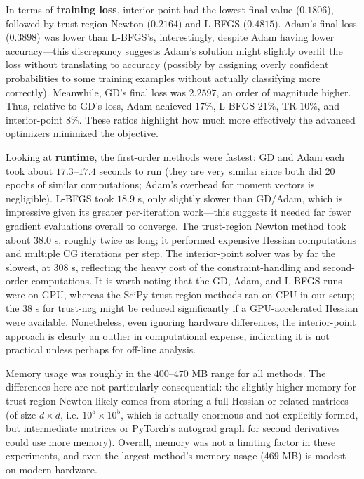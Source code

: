 \documentclass[12pt]{article}
\begin{document}
In terms of \textbf{training loss}, interior-point had the lowest final value ($0.1806$), followed by trust-region Newton ($0.2164$) and L-BFGS ($0.4815$). Adam’s final loss ($0.3898$) was lower than L-BFGS’s, interestingly, despite Adam having lower accuracy—this discrepancy suggests Adam’s solution might slightly overfit the loss without translating to accuracy (possibly by assigning overly confident probabilities to some training examples without actually classifying more correctly). Meanwhile, GD’s final loss was $2.2597$, an order of magnitude higher. Thus, relative to GD’s loss, Adam achieved $17\%$, L-BFGS $21\%$, TR $10\%$, and interior-point $8\%$. These ratios highlight how much more effectively the advanced optimizers minimized the objective.

Looking at \textbf{runtime}, the first-order methods were fastest: GD and Adam each took about $17.3$–$17.4$ seconds to run (they are very similar since both did 20 epochs of similar computations; Adam’s overhead for moment vectors is negligible). L-BFGS took $18.9$ s, only slightly slower than GD/Adam, which is impressive given its greater per-iteration work—this suggests it needed far fewer gradient evaluations overall to converge. The trust-region Newton method took about $38.0$ s, roughly twice as long; it performed expensive Hessian computations and multiple CG iterations per step. The interior-point solver was by far the slowest, at $308$ s, reflecting the heavy cost of the constraint-handling and second-order computations. It is worth noting that the GD, Adam, and L-BFGS runs were on GPU, whereas the SciPy trust-region methods ran on CPU in our setup; the $38$ s for trust-ncg might be reduced significantly if a GPU-accelerated Hessian were available. Nonetheless, even ignoring hardware differences, the interior-point approach is clearly an outlier in computational expense, indicating it is not practical unless perhaps for off-line analysis.

Memory usage was roughly in the $400$–$470$ MB range for all methods. The differences here are not particularly consequential: the slightly higher memory for trust-region Newton likely comes from storing a full Hessian or related matrices (of size $d\times d$, i.e. $10^5 \times 10^5$, which is actually enormous and not explicitly formed, but intermediate matrices or PyTorch’s autograd graph for second derivatives could use more memory). Overall, memory was not a limiting factor in these experiments, and even the largest method’s memory usage (469 MB) is modest on modern hardware.
\end{document}
